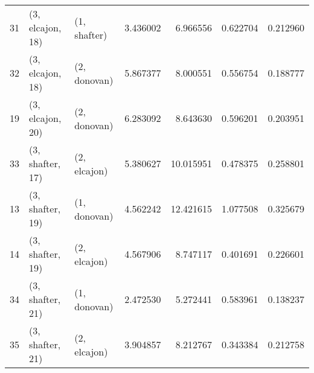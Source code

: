 \begin{tabular}{lllrrrr}
31 &  (3, elcajon, 18) &     (1, shafter) &  3.436002 &   6.966556 &   0.622704 &  0.212960 \\
32 &  (3, elcajon, 18) &     (2, donovan) &  5.867377 &   8.000551 &   0.556754 &  0.188777 \\
19 &  (3, elcajon, 20) &     (2, donovan) &  6.283092 &   8.643630 &   0.596201 &  0.203951 \\
33 &  (3, shafter, 17) &     (2, elcajon) &  5.380627 &  10.015951 &   0.478375 &  0.258801 \\
13 &  (3, shafter, 19) &     (1, donovan) &  4.562242 &  12.421615 &   1.077508 &  0.325679 \\
14 &  (3, shafter, 19) &     (2, elcajon) &  4.567906 &   8.747117 &   0.401691 &  0.226601 \\
34 &  (3, shafter, 21) &     (1, donovan) &  2.472530 &   5.272441 &   0.583961 &  0.138237 \\
35 &  (3, shafter, 21) &     (2, elcajon) &  3.904857 &   8.212767 &   0.343384 &  0.212758 \\
\bottomrule
\end{tabular}
